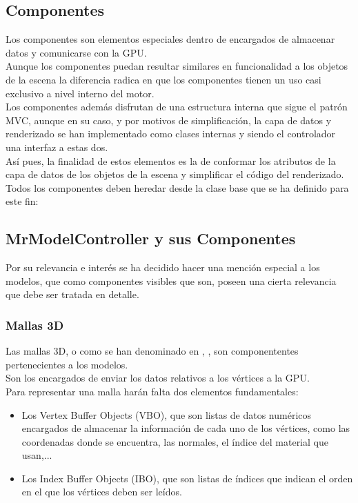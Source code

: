 \subsection{Componentes}
Los componentes son elementos especiales dentro de \robotto encargados de almacenar datos y comunicarse con la GPU.\\
Aunque los componentes puedan resultar similares en funcionalidad a los objetos de la escena la diferencia radica en que los componentes tienen un uso casi exclusivo a nivel interno del motor.\\
Los componentes además disfrutan de una estructura interna que sigue el patrón MVC, aunque en su caso, y por motivos de simplificación, la capa de datos y renderizado se han implementado como clases internas y siendo el controlador una interfaz a estas dos.\\

Así pues, la finalidad de estos elementos es la de conformar los atributos de la capa de datos de los objetos de la escena y simplificar el código del renderizado.\\

Todos los componentes deben heredar desde la clase base que se ha definido para este fin: \rorefcomponent

\subsection{MrModelController y sus Componentes}
Por su relevancia e interés se ha decidido hacer una mención especial a los modelos, que como componentes visibles que son, poseen una cierta relevancia que debe ser tratada en detalle.

\subsubsection{Mallas 3D}
Las mallas 3D, o como se han denominado en \robotto, \rorefmesh, son componententes pertenecientes a los modelos.\\
Son los encargados de enviar los datos relativos a los vértices a la GPU.\\
Para representar una malla harán falta dos elementos fundamentales:

\begin{itemize}
\item Los Vertex Buffer Objects (VBO), que son listas de datos numéricos encargados de almacenar la información de cada uno de los vértices, como las coordenadas donde se encuentra, las normales, el índice del material que usan,...
\item Los Index Buffer Objects (IBO), que son listas de índices que indican el orden en el que los vértices deben ser leídos.
\end{itemize}

